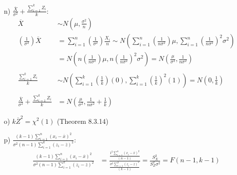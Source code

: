 n) $\frac{\overline{X}}{\sigma^2} + \frac{\sum\limits^k_{i=1} Z_i}{k}$:
\begin{align*}
\overline{X} &\sim N\left(\mu, \frac{\sigma^2}{n}\right) \\
\left(\frac{1}{\sigma^2}\right) \overline{X} &= \sum\limits^n_{i=1} \left(\frac{1}{\sigma^2}\right) \frac{X_i}{n}
  \sim N\left(\sum\limits^n_{i=1} \left(\frac{1}{n\sigma^2}\right) \mu, \sum\limits^n_{i=1} \left(\frac{1}{n\sigma^2}\right)^2 \sigma^2 \right) \\
  &= N\left(n \left(\frac{1}{n\sigma^2}\right) \mu, n \left(\frac{1}{n\sigma^2}\right)^2 \sigma^2 \right) = N\left( \frac{\mu}{\sigma^2}, \frac{1}{n\sigma^2}\right) \\ \\
\frac{\sum\limits^k_{i=1} Z_i}{k} &\sim N\left( \sum\limits^k_{i=1} \left(\frac{1}{k}\right) (0), \sum\limits^k_{i=1} \left(\frac{1}{k}\right)^2 (1)\right) = N\left(0, \frac{1}{k}\right) \\ \\
\frac{\overline{X}}{\sigma^2} + \frac{\sum\limits^k_{i=1} Z_i}{k} &= N\left( \frac{\mu}{\sigma^2}, \frac{1}{n\sigma^2} + \frac{1}{k} \right)
\end{align*}

o) $k\overline{Z}^2 = \chi^2(1)$ (Theorem 8.3.14) 

p) $\frac{(k-1) \sum\limits^n_{i=1}(x_i - \overline{x})^2}{\sigma^2(n-1)\sum\limits^k_{i=1} (z_i - \overline{z})^2}$:
\begin{align*}
\frac{(k-1) \sum\limits^n_{i=1}(x_i - \overline{x})^2}{\sigma^2(n-1)\sum\limits^k_{i=1} (z_i - \overline{z})^2} &=
  \frac{\frac{1^2 \sum\limits^n_{i=1}(x_i - \overline{x})^2}{(n-1)}}{\frac{\sigma^2\sum\limits^k_{i=1} (z_i - \overline{z})^2}{(k-1)}} 
  = \frac{S^2_X}{S^2_Z \sigma^2}
  = F(n-1, k-1) \\
\end{align*}
